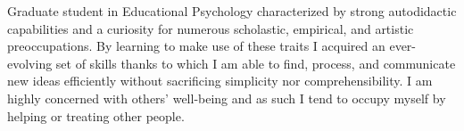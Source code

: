 \begin{minipage}[t]{1\linewidth}
	\vspace{0.25cm}
	Graduate student in Educational Psychology characterized by strong autodidactic capabilities and a curiosity for numerous scholastic, empirical, and artistic preoccupations. By learning to make use of these traits I acquired an ever-evolving set of skills thanks to which I am able to find, process, and communicate new ideas efficiently without sacrificing simplicity nor comprehensibility. I am highly concerned with others' well-being and as such I tend to occupy myself by helping or treating other people.
\end{minipage} 
